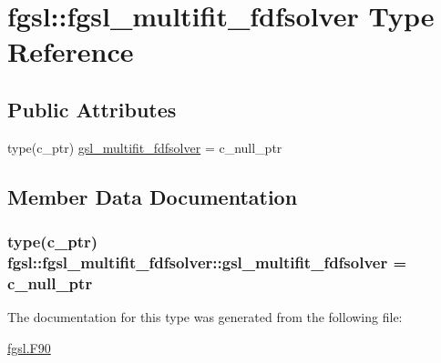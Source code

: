 \hypertarget{structfgsl_1_1fgsl__multifit__fdfsolver}{}\section{fgsl\+:\+:fgsl\+\_\+multifit\+\_\+fdfsolver Type Reference}
\label{structfgsl_1_1fgsl__multifit__fdfsolver}
\subsection*{Public Attributes}
\begin{DoxyCompactItemize}
\item 
type(c\+\_\+ptr) \hyperlink{structfgsl_1_1fgsl__multifit__fdfsolver_ab546ab5dd9e98754df217de1b37d7475}{gsl\+\_\+multifit\+\_\+fdfsolver} = c\+\_\+null\+\_\+ptr
\end{DoxyCompactItemize}


\subsection{Member Data Documentation}
\hypertarget{structfgsl_1_1fgsl__multifit__fdfsolver_ab546ab5dd9e98754df217de1b37d7475}{}
\subsubsection[{gsl\+\_\+multifit\+\_\+fdfsolver}]{\setlength{\rightskip}{0pt plus 5cm}type(c\+\_\+ptr) fgsl\+::fgsl\+\_\+multifit\+\_\+fdfsolver\+::gsl\+\_\+multifit\+\_\+fdfsolver = c\+\_\+null\+\_\+ptr}\label{structfgsl_1_1fgsl__multifit__fdfsolver_ab546ab5dd9e98754df217de1b37d7475}


The documentation for this type was generated from the following file\+:\begin{DoxyCompactItemize}
\item 
\hyperlink{fgsl_8F90}{fgsl.\+F90}\end{DoxyCompactItemize}
